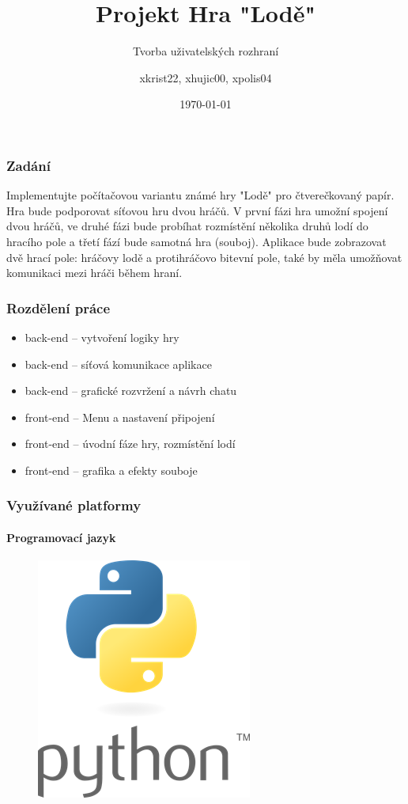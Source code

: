 \documentclass{beamer}
\title{Projekt Hra "Lodě"}
\subtitle{Tvorba uživatelských rozhraní}
\author{xkrist22, xhujic00, xpolis04}
\institute{FIT VUT}
\date{\today}
\begin{document}
	\begin{frame}
		\titlepage
	\end{frame}
	
	\begin{frame}
		\frametitle{Zadání}
Implementujte počítačovou variantu známé hry "Lodě" pro čtverečkovaný papír. Hra bude podporovat síťovou hru dvou hráčů. V první fázi hra umožní spojení dvou hráčů, ve druhé fázi bude probíhat rozmístění několika druhů lodí do hracího pole a třetí fází bude samotná hra (souboj). Aplikace bude zobrazovat dvě hrací pole: hráčovy lodě a protihráčovo bitevní pole, také by měla umožňovat komunikaci mezi hráči během hraní. 
	\end{frame}		

	\begin{frame}
		\frametitle{Rozdělení práce}
		\begin{itemize}
			\item back-end -- vytvoření logiky hry
			\item back-end -- síťová komunikace aplikace
			\item back-end -- grafické rozvržení a návrh chatu
			\item front-end -- Menu a nastavení připojení
			\item front-end -- úvodní fáze hry, rozmístění lodí
			\item front-end -- grafika a efekty souboje
		\end{itemize}
	\end{frame}		
			
	\begin{frame}
		\frametitle{Využívané platformy}
		\framesubtitle{Programovací jazyk}
		\begin{figure}[h]
		\centering
			\includegraphics[scale=0.5]{python_logo.png}
		\end{figure}
	\end{frame}
	
\end{document}
